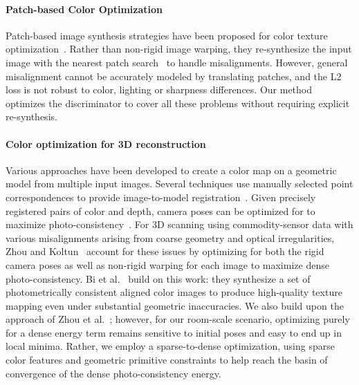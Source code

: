 \paragraph*{Patch-based Color Optimization}
Patch-based image synthesis strategies have been proposed for color texture optimization~\cite{bi2017patch}. Rather than non-rigid image warping, they re-synthesize the input image with the nearest patch search~\cite{simakov2008summarizing} to handle misalignments. 
However, general misalignment cannot be accurately modeled by translating patches, and the L2 loss is not robust to color, lighting or sharpness differences. 
Our method optimizes the discriminator to cover all these problems without requiring explicit re-synthesis.

\paragraph*{Color optimization for 3D reconstruction}  Various approaches have been developed to create a color map on a geometric model from multiple input images.
Several techniques use manually selected point correspondences to provide image-to-model registration~\cite{neugebauer1999texturing,ofek1997multiresolution,stamos20003d,rocchini1999multiple}. 
Given precisely registered pairs of color and depth, camera poses can be optimized for to maximize photo-consistency~\cite{johnson1999registration,pulli2000surface,pulli2005projective,bernardini2001high}. For 3D scanning using commodity-sensor data with various misalignments arising from coarse geometry and optical irregularities, Zhou and Koltun~\cite{zhou2014color} account for these issues by optimizing for both the rigid camera poses as well as non-rigid warping for each image to maximize dense photo-consistency. 
Bi et al.~\cite{PatchBasedTextureMapping} build on this work: they synthesize a set of photometrically consistent aligned color images to produce high-quality texture mapping even under substantial geometric inaccuracies.
We also build upon the approach of Zhou et al.~\cite{zhou2014color}; however, for our room-scale scenario, optimizing purely for a dense energy term remains sensitive to initial poses and easy to end up in local minima. 
Rather, we employ a sparse-to-dense optimization, using sparse color features and geometric primitive constraints to help reach the basin of convergence of the dense photo-consistency energy.

